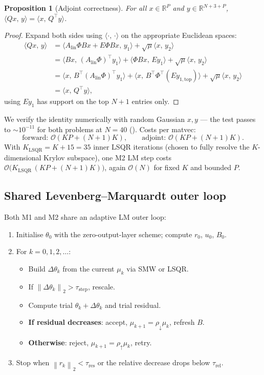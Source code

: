 \documentclass[11pt,a4paper]{article}
\newcommand{\R}{\mathbb{R}}
\newcommand{\norm}[1]{\left\lVert #1 \right\rVert}
\newcommand{\inner}[2]{\langle #1,\, #2\rangle}
\newcommand{\Order}{\mathcal{O}}
\newcommand{\Alin}{A_{\mathrm{lin}}}
\newcommand{\Bt}{B^{\!\top}}
\newcommand{\Phit}{\Phi^{\!\top}}
\newtheorem{proposition}{Proposition}
\begin{document}
\begin{proposition}[Adjoint correctness]
For all $x\in\R^{P}$ and $y\in\R^{N+3+P}$, $\inner{Q x}{y} = \inner{x}{Q^{\!\top} y}$.
\end{proposition}

\begin{proof}
Expand both sides using $\inner{\cdot}{\cdot}$ on the appropriate Euclidean spaces:
\begin{align*}
\inner{Q x}{y}
&= \inner{\Alin\Phi B x + E\Phi B x}{y_{1}} + \sqrt{\mu}\inner{x}{y_{2}}\\
&= \inner{B x}{(\Alin\Phi)^{\!\top}y_{1}} + \inner{\Phi B x}{E y_{1}} + \sqrt{\mu}\inner{x}{y_{2}}\\
&= \inner{x}{\Bt(\Alin\Phi)^{\!\top}y_{1}} + \inner{x}{\Bt \Phit (E y_{1,\mathrm{top}})} + \sqrt{\mu}\inner{x}{y_{2}}\\
&= \inner{x}{Q^{\!\top}y},
\end{align*}
using $E y_{1}$ has support on the top $N+1$ entries only.
\end{proof}

We verify the identity numerically with random Gaussian $x,y$ — the test passes
to $\sim\!10^{-11}$ for both problems at $N=40$ (). Costs per
matvec:
\[
\text{forward: } \Order(KP + (N+1)K), \qquad
\text{adjoint: } \Order(KP + (N+1)K).
\]
With $K_{\mathrm{LSQR}} = K + 15 = 35$ inner LSQR iterations (chosen to fully
resolve the $K$-dimensional Krylov subspace), one M2 LM step costs
$\Order\bigl(K_{\mathrm{LSQR}}\,(KP + (N+1)K)\bigr)$, again $\Order(N)$ for fixed
$K$ and bounded $P$.

\subsection{Shared Levenberg--Marquardt outer loop}
\label{sec:lm}

Both M1 and M2 share an adaptive LM outer loop:

\begin{enumerate}
    \item Initialise $\theta_{0}$ with the zero-output-layer scheme; compute
        $r_{0}$, $u_{0}$, $B_{0}$.
    \item For $k = 0, 1, 2, \ldots$:
    \begin{itemize}
        \item Build $\Delta\theta_{k}$ from the current $\mu_{k}$ via SMW or LSQR.
        \item If $\norm{\Delta\theta_{k}}_{2} > \tau_{\mathrm{step}}$, rescale.
        \item Compute trial $\theta_{k}+\Delta\theta_{k}$ and trial residual.
        \item \textbf{If residual decreases}: accept, $\mu_{k+1} = \rho_{\downarrow}\mu_{k}$,
              refresh $B$.
        \item \textbf{Otherwise}: reject, $\mu_{k+1} = \rho_{\uparrow}\mu_{k}$, retry.
    \end{itemize}
    \item Stop when $\norm{r_{k}}_{2} < \tau_{\mathrm{res}}$ or the relative
        decrease drops below $\tau_{\mathrm{rel}}$.
\end{enumerate}
\end{document}

